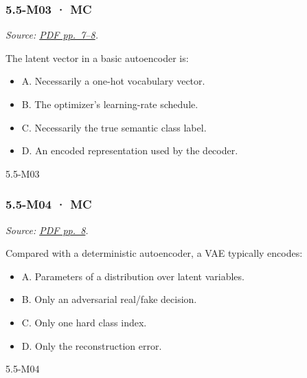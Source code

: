 \noindent\begin{minipage}{\linewidth}

\subsubsection{5.5-M03 · MC}\label{m03-mc-16}

\emph{Source:
\href{../Lecture\%20Slides/5.5.\%20Generative\%20Models.pdf\#page=7}{PDF
pp.~7--8}.}

The latent vector in a basic autoencoder is:

\begin{itemize}
\tightlist
\item
  A. Necessarily a one-hot vocabulary vector.
\item
  B. The optimizer's learning-rate schedule.
\item
  C. Necessarily the true semantic class label.
\item
  D. An encoded representation used by the decoder.
\end{itemize}

\begin{solution}[8mm]{5.5-M03}

\end{solution}
\end{minipage}\par\medskip

\noindent\begin{minipage}{\linewidth}

\subsubsection{5.5-M04 · MC}\label{m04-mc-16}

\emph{Source:
\href{../Lecture\%20Slides/5.5.\%20Generative\%20Models.pdf\#page=8}{PDF
pp.~8}.}

Compared with a deterministic autoencoder, a VAE typically encodes:

\begin{itemize}
\tightlist
\item
  A. Parameters of a distribution over latent variables.
\item
  B. Only an adversarial real/fake decision.
\item
  C. Only one hard class index.
\item
  D. Only the reconstruction error.
\end{itemize}

\begin{solution}[8mm]{5.5-M04}

\end{solution}
\end{minipage}\par\medskip

